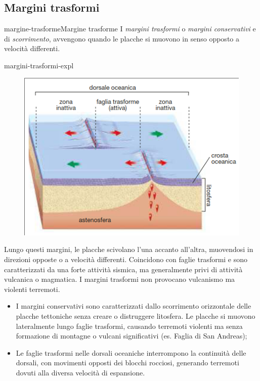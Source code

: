 \documentclass[preview]{standalone}
\begin{document}
\subsection{Margini trasformi}

\begin{snippetdefinition}{margine-trasforme}{Margine trasforme}
    I \textit{margini trasformi} o \textit{margini conservativi} e di \textit{scorrimento},
    avvengono quando le placche si muovono in senso opposto a velocità differenti.
\end{snippetdefinition}

\begin{snippet}{margini-trasformi-expl}
    \setlength{\intextsep}{0pt}%
    \begin{figure}
        \includegraphics[width=.45\textwidth]{resources/margini-trasformi.png}
    \end{figure}

    Lungo questi margini, le placche scivolano l'una accanto all'altra, muovendosi in
    direzioni opposte o a velocità differenti. Coincidono con faglie trasformi e sono
    caratterizzati da una forte attività sismica, ma generalmente privi di attività
    vulcanica o magmatica.
    I margini trasformi non provocano vulcanismo ma violenti terremoti.
    \wrapfill
    \vspace{-1cm}
    \begin{itemize}
        \item I margini conservativi sono caratterizzati dallo scorrimento orizzontale delle placche
            tettoniche senza creare o distruggere litosfera. Le placche si muovono lateralmente
            lungo faglie trasformi, causando terremoti violenti ma senza formazione di montagne o
            vulcani significativi (es. Faglia di San Andreas);
        \item Le faglie trasformi nelle dorsali oceaniche interrompono la continuità delle dorsali,
            con movimenti opposti dei blocchi rocciosi, generando terremoti dovuti alla diversa
            velocità di espansione.
    \end{itemize}
\end{snippet}
\end{document}
